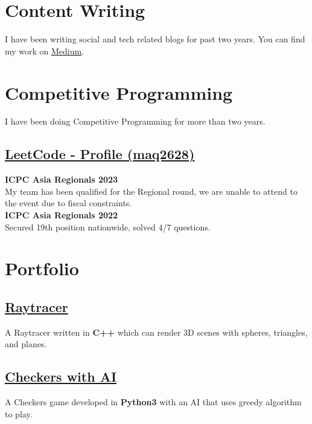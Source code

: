 \documentclass[]{resume}
\begin{document}
\begin{minipage}[t]{0.5\textwidth}

    \section{Content Writing}
    I have been writing social and tech related blogs for past two years. You can find my work on \href{https://medium.com/@mesumali26-ma}{Medium}.

    \section{Competitive Programming}
    I have been doing Competitive Programming for more than two years.\\
    \subsection{\href{https://leetcode.com/maq2628/}{\textbf{LeetCode - Profile (maq2628)}}}
    \textbf{ICPC Asia Regionals 2023}\\
    My team has been qualified for the Regional round, we are unable to attend to the event due to fiscal constraints.\\
    \textbf{ICPC Asia Regionals 2022}\\
    Secured 19th position nationwide, solved 4/7 questions.


    \section{Portfolio}

    \subsection{\href{https://github.com/Qazalbash/Raytracer}{\textbf{Raytracer}}}%
    A Raytracer written in \textbf{C++} which can render 3D scenes with spheres, triangles, and planes.

    \subsection{\href{https://github.com/Qazalbash/Checkers-with-AI}{\textbf{Checkers with AI}}}%
    A Checkers game developed in \textbf{Python3} with an AI that uses greedy algorithm to play.


\end{minipage}
\end{document}
